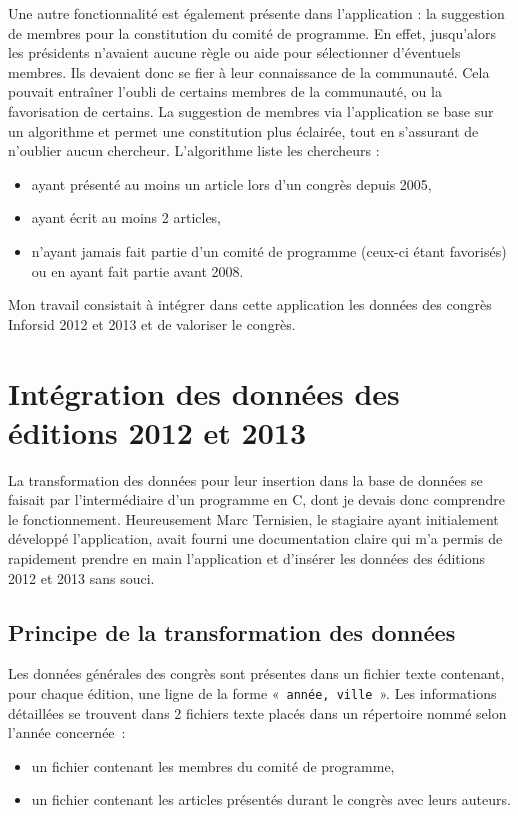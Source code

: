 		Une autre fonctionnalité est également présente dans l'application : la suggestion de membres pour la constitution du comité de programme. En effet, jusqu'alors les présidents n'avaient aucune règle ou aide pour sélectionner d'éventuels membres. Ils devaient donc se fier à leur connaissance de la communauté. Cela pouvait entraîner l'oubli de certains membres de la communauté, ou la favorisation de certains. La suggestion de membres via l'application se base sur un algorithme et permet une constitution plus éclairée, tout en s'assurant de n'oublier aucun chercheur. L'algorithme liste les chercheurs :
		\begin{itemize}
			\item ayant présenté au moins un article lors d'un congrès depuis 2005, 
			\item ayant écrit au moins 2 articles,
			\item n'ayant jamais fait partie d'un comité de programme (ceux-ci étant favorisés) ou en ayant fait partie avant 2008.
		\end{itemize}
		
		Mon travail consistait à intégrer dans cette application les données des congrès Inforsid 2012 et 2013 et de valoriser le congrès.
		

	\section{Intégration des données des éditions 2012 et 2013}
		La transformation des données pour leur insertion dans la base de données se faisait par l'intermédiaire d'un programme en C, dont je devais donc comprendre le fonctionnement. Heureusement Marc Ternisien, le stagiaire ayant initialement développé l'application, avait fourni une documentation claire qui m'a permis de rapidement prendre en main l'application et d'insérer les données des éditions 2012 et 2013 sans souci.
		
		
			\subsection{Principe de la transformation des données}
				Les données générales des congrès sont présentes dans un fichier texte contenant, pour chaque édition, une ligne de la forme «~\texttt{année, ville}~».
				Les informations détaillées se trouvent dans 2 fichiers texte placés dans un répertoire nommé selon l'année concernée~:
				\begin{itemize}
					\item un fichier contenant les membres du comité de programme,
					\item un fichier contenant les articles présentés durant le congrès avec leurs auteurs.
				\end{itemize}
				
